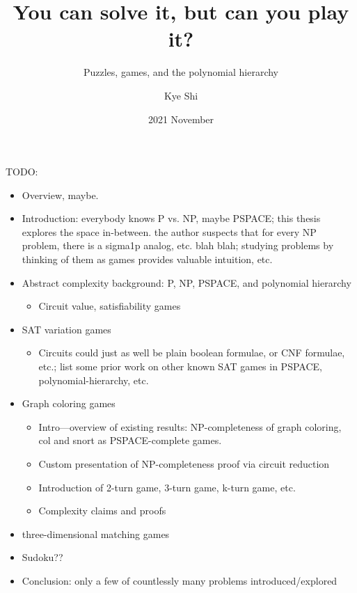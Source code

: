 \documentclass{final-report}
\title{You can solve it, but can you play it?}
\subtitle{Puzzles, games, and the polynomial hierarchy}
\author{Kye Shi}
\date{2021 November}
\begin{document}
\frontmatter
\maketitle
\tableofcontents

TODO:

\begin{itemize}
  \item Overview, maybe.
  \item Introduction: everybody knows P vs. NP, maybe PSPACE; this thesis
    explores the space in-between.  the author suspects that for every NP
    problem, there is a sigma1p analog, etc. blah blah; studying problems by
    thinking of them as games provides valuable intuition, etc.
  \item Abstract complexity background: P, NP, PSPACE, and polynomial hierarchy
    \begin{itemize}
      \item Circuit value, satisfiability games
    \end{itemize}
  \item SAT variation games
    \begin{itemize}
      \item Circuits could just as well be plain boolean formulae, or CNF
        formulae, etc.; list some prior work on other known SAT games in
        PSPACE, polynomial-hierarchy, etc.
    \end{itemize}
  \item Graph coloring games
    \begin{itemize}
      \item Intro---overview of existing results: NP-completeness of graph
        coloring, col and snort as PSPACE-complete games.
      \item Custom presentation of NP-completeness proof via circuit reduction
      \item Introduction of 2-turn game, 3-turn game, k-turn game, etc.
      \item Complexity claims and proofs
    \end{itemize}
  \item three-dimensional matching games
  \item Sudoku??
  \item Conclusion: only a few of countlessly many problems introduced/explored
\end{itemize}


\mainmatter



%
%
%
%

\printbibliography[heading=bibnumbered]
\end{document}
